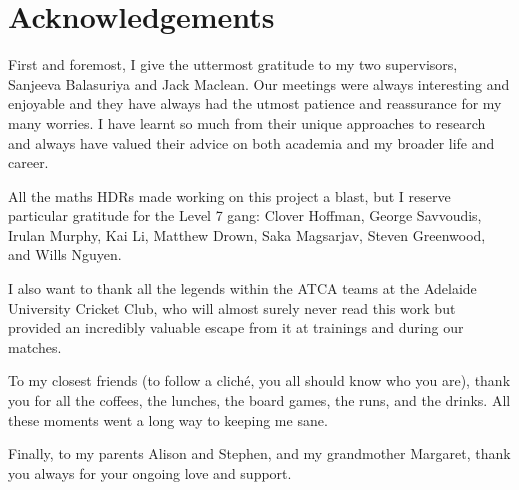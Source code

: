 \chapter{Acknowledgements}
\label{ch:acknowledgements}

First and foremost, I give the uttermost gratitude to my two supervisors, Sanjeeva Balasuriya and Jack Maclean.
Our meetings were always interesting and enjoyable and they have always had the utmost patience and reassurance for my many worries.
I have learnt so much from their unique approaches to research and always have valued their advice on both academia and my broader life and career.

All the maths HDRs made working on this project a blast, but I reserve particular gratitude for the Level 7 gang: Clover Hoffman, George Savvoudis, Irulan Murphy, Kai Li, Matthew Drown, Saka Magsarjav, Steven Greenwood, and Wills Nguyen.

I also want to thank all the legends within the ATCA teams at the Adelaide University Cricket Club, who will almost surely never read this work but provided an incredibly valuable escape from it at trainings and during our matches.

To my closest friends (to follow a clich\'e, you all should know who you are), thank you for all the coffees, the lunches, the board games, the runs, and the drinks.
All these moments went a long way to keeping me sane.

Finally, to my parents Alison and Stephen, and my grandmother Margaret, thank you always for your ongoing love and support.
